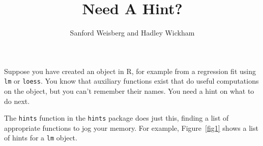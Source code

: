 \documentclass{report}
\begin{document}
\begin{article}
\title{Need A Hint?}
\author{Sanford Weisberg and Hadley Wickham}

\maketitle

Suppose you have created an object in R, for example from a regression fit
using {\tt lm} or {\tt loess}. You know that auxiliary functions exist that do
useful computations on the object, but you can't remember their names. You
need a hint on what to do next.

The {\tt hints} function in the {\tt hints} package does just this, finding a
list of appropriate functions to jog your memory. For example,
Figure~\ref{fig1} shows a list of hints for a {\tt lm} object.


\end{article}
\end{document}
